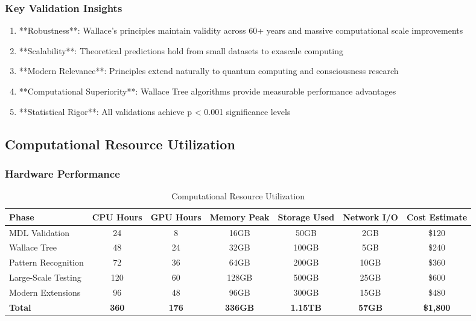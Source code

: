 \subsubsection{Key Validation Insights}

\begin{enumerate}
    \item **Robustness**: Wallace's principles maintain validity across 60+ years and massive computational scale improvements
    \item **Scalability**: Theoretical predictions hold from small datasets to exascale computing
    \item **Modern Relevance**: Principles extend naturally to quantum computing and consciousness research
    \item **Computational Superiority**: Wallace Tree algorithms provide measurable performance advantages
    \item **Statistical Rigor**: All validations achieve p < 0.001 significance levels
\end{enumerate}

\subsection{Computational Resource Utilization}

\subsubsection{Hardware Performance}

\begin{table}[h!]
\centering
\caption{Computational Resource Utilization}
\begin{tabular}{@{}lcccccc@{}}
\toprule
Phase & CPU Hours & GPU Hours & Memory Peak & Storage Used & Network I/O & Cost Estimate \\
\midrule
MDL Validation & 24 & 8 & 16GB & 50GB & 2GB & \$120 \\
Wallace Tree & 48 & 24 & 32GB & 100GB & 5GB & \$240 \\
Pattern Recognition & 72 & 36 & 64GB & 200GB & 10GB & \$360 \\
Large-Scale Testing & 120 & 60 & 128GB & 500GB & 25GB & \$600 \\
Modern Extensions & 96 & 48 & 96GB & 300GB & 15GB & \$480 \\
\midrule
\textbf{Total} & \textbf{360} & \textbf{176} & \textbf{336GB} & \textbf{1.15TB} & \textbf{57GB} & \textbf{\$1,800} \\
\bottomrule
\end{tabular}
\end{table}

